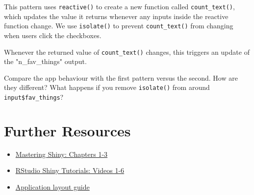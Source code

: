 \documentclass[
  oneside]{book}
\newenvironment{Shaded}{\begin{snugshade}}{\end{snugshade}}
\newcommand{\CommentTok}[1]{\textcolor[rgb]{0.56,0.35,0.01}{\textit{#1}}}
\newcommand{\ControlFlowTok}[1]{\textcolor[rgb]{0.13,0.29,0.53}{\textbf{#1}}}
\newcommand{\FunctionTok}[1]{\textcolor[rgb]{0.00,0.00,0.00}{#1}}
\newcommand{\NormalTok}[1]{#1}
\newcommand{\OtherTok}[1]{\textcolor[rgb]{0.56,0.35,0.01}{#1}}
\newcommand{\SpecialCharTok}[1]{\textcolor[rgb]{0.00,0.00,0.00}{#1}}
\newcommand{\StringTok}[1]{\textcolor[rgb]{0.31,0.60,0.02}{#1}}
\providecommand{\tightlist}{%
  \setlength{\itemsep}{0pt}\setlength{\parskip}{0pt}}
\begin{document}
\begin{Shaded}
\end{Shaded}

This pattern uses \texttt{reactive}\texttt{()} to create a new function called \texttt{count\_text}\texttt{()}, which updates the value it returns whenever any inputs inside the reactive function change. We use \texttt{isolate}\texttt{()} to prevent \texttt{count\_text}\texttt{()} from changing when users click the checkboxes.

Whenever the returned value of \texttt{count\_text}\texttt{()} changes, this triggers an update of the \StringTok{"n\_fav\_things"} output.

\begin{try}
Compare the app behaviour with the first pattern versus the second. How are they different? What happens if you remove \texttt{isolate}\texttt{()} from around \texttt{input\$fav\_things}?

\end{try}

\hypertarget{resources-first-app}{%
\section{Further Resources}\label{resources-first-app}}

\begin{itemize}
\tightlist
\item
  \href{https://mastering-shiny.org/}{Mastering Shiny: Chapters 1-3}
\item
  \href{https://shiny.rstudio.com/tutorial/}{RStudio Shiny Tutorials: Videos 1-6}
\item
  \href{https://shiny.rstudio.com/articles/layout-guide.html}{Application layout guide}
\end{itemize}
\end{document}

